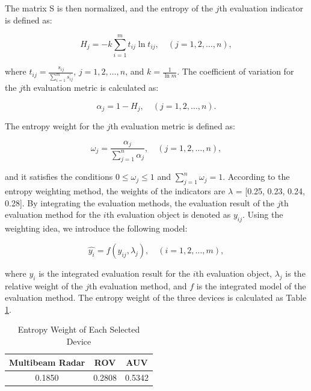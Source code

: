 \documentclass[12pt]{article}
\begin{document}
The matrix S is then normalized, and the entropy of the $j$th evaluation indicator is defined as:

\begin{equation}
    H_j = -k\sum_{i=1}^m t_{ij}\ln t_{ij}, \quad (j = 1, 2, \ldots, n),
\end{equation}

where $t_{ij} = \frac{s_{ij}}{\sum_{i=1}^{m}s_{ij}^{'}}$, $j = 1, 2, \ldots, n$, and $k = \frac{1}{\ln m}$. The coefficient of variation for the $j$th evaluation metric is calculated as:

\begin{equation}
    \alpha_j = 1 - H_j, \quad (j = 1, 2, \ldots, n).
\end{equation}

The entropy weight for the $j$th evaluation metric is defined as:

\begin{equation}
    \omega_j = \frac{\alpha_j}{\sum_{j=1}^n\alpha_j}, \quad (j = 1, 2, \ldots, n),
\end{equation}

and it satisfies the conditions $0 \leq \omega_j \leq 1$ and $\sum_{j=1}^n\omega_j = 1$. According to the entropy weighting method, the weights of the indicators are $\lambda$ = [0.25, 0.23, 0.24, 0.28]. By integrating the evaluation methods, the evaluation result of the $j$th evaluation method for the $i$th evaluation object is denoted as $y_{ij}$. Using the weighting idea, we introduce the following model:

\begin{equation}
    \hat{y_i} = f(y_{ij},\lambda_j), \quad (i = 1,2,\ldots,m),
\end{equation}

where $\hat{y_i}$ is the integrated evaluation result for the $i$th evaluation object, $\lambda_j$ is the relative weight of the $j$th evaluation method, and $f$ is the integrated model of the evaluation method. The entropy weight of the three devices is calculated as Table \ref{tab:entropy_weight}.

\begin{table}[h!]
    \centering
    \caption{Entropy Weight of Each Selected Device}
    \vspace{.4cm}
    \label{tab:entropy_weight}
    \begin{tabular}{ccc}
        \toprule
        Multibeam Radar & ROV    & AUV    \\ \midrule
        0.1850          & 0.2808 & 0.5342 \\ \bottomrule
    \end{tabular}
\end{table}
\end{document}
